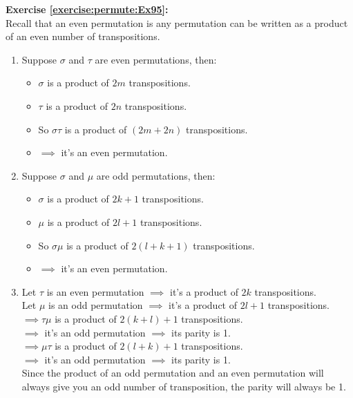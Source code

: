 \noindent\textbf{Exercise  \ref{exercise:permute:Ex95}:}\\ %
Recall that an even permutation is any permutation can be written as a product of an even number of transpositions.
\begin{enumerate}[{a.}]
\item
Suppose $\sigma$ and $\tau$ are even permutations, then:
	\begin{itemize}
	\item
	$\sigma$ is a product of $2m$ transpositions.

	\item
	$\tau$ is a product of $2n$ transpositions.

	\item
	So $\sigma\tau$ is a product of $(2m+2n)$ transpositions.

	\item
	$\implies$  it's an even permutation.
	\end{itemize}

\item
Suppose $\sigma$ and $\mu$ are odd permutations, then:
	\begin{itemize}
	\item
	$\sigma$ is a product of $2k+1$ transpositions.

	\item
	$\mu$ is a product of $2l+1$ transpositions.

	\item
	So $\sigma\mu$ is a product of $2(l+k+1)$ transpositions.
	
	\item
	$\implies$  it's an even permutation.
	\end{itemize}

\item
Let $\tau$ is an even permutation $\implies$  it's a product of $2k$ transpositions.\\
Let $\mu$ is an odd permutation $\implies$  it's a product of $2l+1$ transpositions.\\
$\implies \tau\mu$ is a product of $2(k+l)+1$ transpositions.\\
$\implies$  it's an odd permutation $\implies$  its parity is 1.\\
$\implies \mu\tau$ is a product of $2(l+k)+1$ transpositions.\\
$\implies$  it's an odd permutation $\implies$  its parity is 1.\\
Since the product of an odd permutation and an even permutation will always give you an odd number of transposition, the parity will always be 1.
\end{enumerate}

